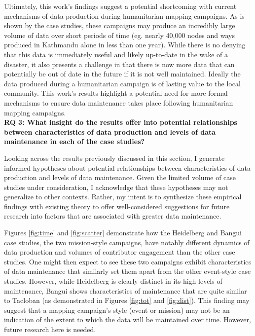 Ultimately, this work's findings suggest a potential shortcoming with current mechanisms of data production during humanitarian mapping campaigns. As is shown by the case studies, these campaigns may produce an incredibly large volume of data over short periods of time (eg. nearly 40,000 nodes and ways produced in Kathmandu alone in less than one year). While there is no denying that this data is immediately useful and likely up-to-date in the wake of a disaster, it also presents a challenge in that there is now more data that can potentially be out of date in the future if it is not well maintained. Ideally the data produced during a humanitarian campaign is of lasting value to the local community. This work's results highlight a potential need for more formal mechanisms to ensure data maintenance takes place following humanitarian mapping campaigns.\\

\noindent\textbf{RQ 3: What insight do the results offer into potential relationships between characteristics of data production and levels of data maintenance in each of the case studies?}

Looking across the results previously discussed in this section, I generate informed hypotheses about potential relationships between characteristics of data production and levels of data maintenance. Given the limited volume of case studies under consideration, I acknowledge that these hypotheses may not generalize to other contexts. Rather, my intent is to synthesize these empirical findings with existing theory to offer well-considered suggestions for future research into factors that are associated with greater data maintenance. 

Figures \ref{fig:time} and \ref{fig:scatter} demonstrate how the Heidelberg and Bangui case studies, the two mission-style campaigns, have notably different dynamics of data production and volumes of contributor engagement than the other case studies. One might then expect to see these two campaigns exhibit characteristics of data maintenance that similarly set them apart from the other event-style case studies. However, while Heidelberg is clearly distinct in its high levels of maintenance, Bangui shows characteristics of maintenance that are quite similar to Tacloban (as demonstrated in Figures \ref{fig:tot} and \ref{fig:dist}). This finding may suggest that a mapping campaign’s style (event or mission) may not be an indication of the extent to which the data will be maintained over time. However, future research here is needed. 

